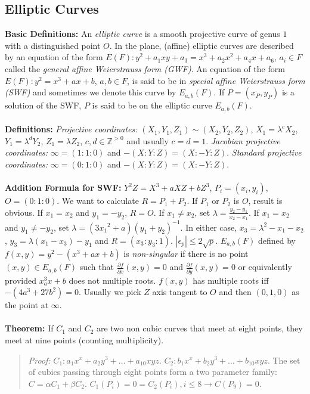 \subsection{Elliptic Curves}
{\bf Basic Definitions:}  An \emph{elliptic curve} is a smooth projective curve of
genus $1$ with a distinguished point $O$.  In the plane, (affine)
elliptic curves are described by an equation of the form
$E(F): y^2 +a_1 xy + a_3 = x^3 +a_2 x^2 + a_4 x + a_6$, $a_i \in F$ 
called the \emph{general affine Weierstrauss form (GWF)}.
An equation of the form
$E(F): y^2 = x^3 + a x + b$, $a, b \in F$, is said to be in
\emph{special affine Weierstrauss form (SWF)} and
sometimes we denote this curve by $E_{a,b}(F)$.  
If $P=(x_P, y_P)$ is a solution of
the SWF, $P$ is said to be on the elliptic curve $E_{a,b}(F)$.
\\
\\
{\bf Definitions:}
\emph{Projective coordinates:}
$(X_1 , Y_1, Z_1) \sim (X_2 , Y_2, Z_2)$, 
$X_1 = \lambda^c X_2$, $Y_1 = \lambda^d Y_2$, $Z_1 = \lambda Z_2$, 
$c,d \in {\mathbb Z}^{>0}$ and usually $c=d=1$.
\emph{Jacobian projective coordinates:} $\infty= (1:1:0)$ and $-(X:Y:Z)=(X:-Y:Z)$.
\emph{Standard projective coordinates:} $\infty= (0:1:0)$ and $-(X:Y:Z)=(X:-Y:Z)$.
\\
\\
{\bf Addition Formula for SWF:}
$Y^{2}Z= X^{3}+aXZ+bZ^{3}$, $P_{i}= (x_{i},y_{i})$, $O=(0:1:0)$.
We want to calculate $R=P_1+P_2$.  If $P_1$ or $P_2$ is $O$, result is obvious.
If $x_1=x_2$ and $y_1= - y_2$, $R=O$.
If $x_1 \ne x_2$, set
$\lambda ={\frac {y_{2}-y_{1}} {x_{2}-x_{1}}}$.  If $x_1 = x_2$ and
$y_1 \ne - y_2$, set $\lambda= (3{x_1}^2+a)(y_1+y_2)^{-1}$.
In either case, $x_3= \lambda^2 - x_1 -x_2$,
$y_3= \lambda(x_1-x_3)-y_1$ and $R= (x_3 : y_3 : 1)$.
$|\epsilon_{p}| \leq 2{\sqrt p}$.  $E_{a,b}(F)$
defined by $f(x,y)= y^2-(x^3+ax+b)$ is \emph{non-singular}
if there is no point $(x,y)\in E_{a,b}(F)$ such that
${\frac {\partial f} {\partial x}} (x,y)=0$ and
${\frac {\partial f} {\partial y}} (x,y)=0$ or equivalently
provided
$x^3_ax+b$ does not multiple roots.
$f(x,y)$ has multiple roots iff $-(4a^3 + 27 b^2)=0$.  
Usually we pick $Z$ axis tangent to
$O$ and then $(0,1,0)$ as the point at $\infty$. 
\\
\\
{\bf Theorem:}  
If $C_1$ and $C_2$ are two non cubic curves that meet
at eight points, they meet at nine points (counting multiplicity).
\begin{quote}
\emph{Proof:}
$C_1: a_1x^x+a_2y^3+ \ldots + a_{10}xyz$.
$C_2: b_1x^x+b_2y^3+ \ldots + b_{10}xyz$.  The set of cubics passing through eight
points form a two parameter family: $C= \alpha C_1 + \beta C_2$.
$C_1(P_i)=0=C_2(P_i), i \le 8 \rightarrow C(P_9)=0$.
\end{quote}
